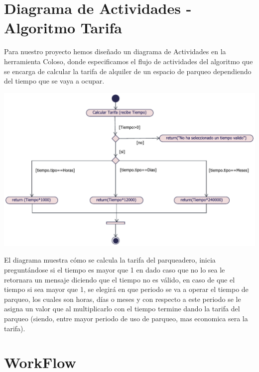 \section{Diagrama de Actividades - Algoritmo Tarifa}
\begin{flushleft}
	Para nuestro proyecto hemos diseñado un diagrama de Actividades en la herramienta Coloso, donde especificamos el flujo de actividades del algoritmo que se encarga de calcular la tarifa de alquiler de un espacio de parqueo dependiendo del tiempo que se vaya a ocupar.
	\\

	\begin{center}
		{\includegraphics[width=1.18\linewidth]{imgs/DiagramaActividades-Algoritmo/DiagramaActividades-AlgoritmoTarifa}}
	\end{center}
	El diagrama muestra cómo se calcula la tarifa del parqueadero, inicia preguntándose si el tiempo es mayor que 1 en dado caso que no lo sea le retornara un mensaje diciendo que el tiempo no es válido, en caso de que el tiempo si sea mayor que 1, se elegirá en que periodo se va a operar el tiempo de parqueo, los cuales son horas, días o meses y con respecto a este periodo se le asigna un valor que al multiplicarlo con el tiempo termine dando la tarifa del parqueo (siendo, entre mayor periodo de uso de parqueo, mas economica sera la tarifa).
\end{flushleft}

\newpage
\section{WorkFlow}
